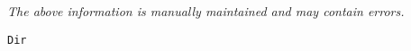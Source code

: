 \label{pkg:dir}

{\tiny \it The above information is manually maintained and may contain errors.}
\begin{verbatim}
Dir
\end{verbatim}

